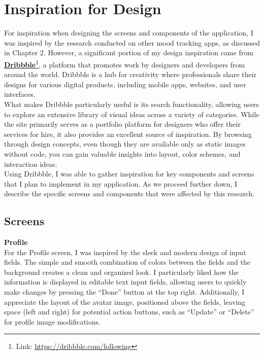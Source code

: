 \section{Inspiration for Design}

For inspiration when designing the screens and components of the application, I was inspired by the research conducted on other mood tracking apps, as discussed in Chapter 2. However, a significant portion of my design inspiration came from \textbf{\href{https://dribbble.com/following}{Dribbble}}\footnote{Link: \url{https://dribbble.com/following}}, a platform that promotes work by designers and developers from around the world. Dribbble is a hub for creativity where professionals share their designs for various digital products, including mobile apps, websites, and user interfaces.\vspace{5mm} \\
What makes Dribbble particularly useful is its search functionality, allowing users to explore an extensive library of visual ideas across a variety of categories. While the site primarily serves as a portfolio platform for designers who offer their services for hire, it also provides an excellent source of inspiration. By browsing through design concepts, even though they are available only as static images without code, you can gain valuable insights into layout, color schemes, and interaction ideas.\vspace{5mm} \\
Using Dribbble, I was able to gather inspiration for key components and screens that I plan to implement in my application. As we proceed further down, I describe the specific screens and components that were affected by this research.

\subsection{Screens}

\noindent \textbf{Profile} \\
For the Profile screen, I was inspired by the sleek and modern design of input fields. The simple and smooth combination of colors between the fields and the background creates a clean and organized look. I particularly liked how the information is displayed in editable text input fields, allowing users to quickly make changes by pressing the ``Done'' button at the top right. Additionally, I appreciate the layout of the avatar image, positioned above the fields, leaving space (left and right) for potential action buttons, such as ``Update'' or ``Delete'' for profile image modifications.

